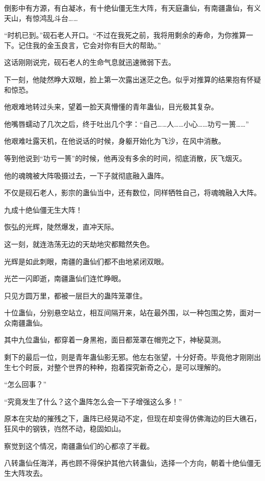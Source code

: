 \begin{this_body}
倒影中有方源，有白凝冰，有十绝仙僵无生大阵，有天庭蛊仙，有南疆蛊仙，有义天山，有惊鸿乱斗台……

“时机已到。”砚石老人开口。“不过在我死之前，我将用剩余的寿命，为你推算一下。记住我的金玉良言，它会对你有巨大的帮助。”

这话刚刚说完，砚石老人的生命气息就迅速微弱下去。

下一刻，他陡然睁大双眼，脸上第一次露出迷茫之色。似乎对推算的结果抱有怀疑和惊恐。

他艰难地转过头来，望着一脸天真懵懂的青年蛊仙，目光极其复杂。

他嘴唇蠕动了几次之后，终于吐出几个字：“自己……人……小心……功亏一篑……”

他艰难吐露天机，在他说话的时候，身躯开始化为飞沙，在风中消散。

等到他说到“功亏一篑”的时候，他再没有多余的时间，彻底消散，灰飞烟灭。

他的魂魄被大阵吸摄过去，一下子就彻底融入蛊阵。

不仅是砚石老人，影宗的蛊仙当中，还有数位，同样牺牲自己，将魂魄融入大阵。

九成十绝仙僵无生大阵！

恢弘的光辉，陡然爆发，直冲天际。

这一刻，就连浩荡无边的天劫地灾都黯然失色。

光辉是如此刺眼，南疆的蛊仙们都不由地紧闭双眼。

光芒一闪即逝，南疆蛊仙们连忙睁眼。

只见方圆万里，都被一层巨大的蛊阵笼罩住。

十位蛊仙，分别悬空站立，相互间隔开来，站在最外围，以一种包围之势，面对一众南疆蛊仙。

其中九位蛊仙，都穿着一身黑袍，面目都笼罩在帽兜之下，神秘莫测。

剩下的最后一位，则是青年蛊仙影无邪。他左右张望，十分好奇。毕竟他才刚刚出生七个时辰，对整个世界的种种，抱着探究新奇之心，是可以理解的。

“怎么回事？”

“究竟发生了什么？这个蛊阵怎么会一下子增强这么多！”

原本在灾劫的摧残之下，蛊阵已经晃动不定，但现在却变得仿佛海边的巨大礁石，狂风中的钢铁，岿然不动，稳固如山。

察觉到这个情况，南疆蛊仙们的心都凉了半截。

八转蛊仙任海洋，再也顾不得保护其他六转蛊仙，选择一个方向，朝着十绝仙僵无生大阵攻去。


\end{this_body}
